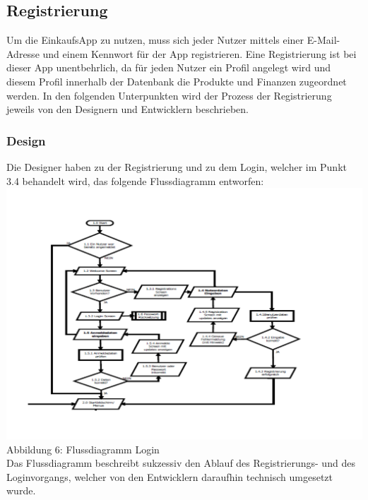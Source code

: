 \documentclass[12pt,a4paper]{article}
\begin{document}
\subsection{Registrierung}
Um die EinkaufsApp zu nutzen, muss sich jeder Nutzer mittels einer E-Mail-Adresse und einem Kennwort für der App registrieren.
Eine Registrierung ist bei dieser App unentbehrlich, da für jeden Nutzer ein Profil angelegt wird und diesem Profil innerhalb der Datenbank die Produkte und Finanzen zugeordnet werden.
In den folgenden Unterpunkten wird der Prozess der Registrierung jeweils von den Designern und Entwicklern beschrieben.
\subsubsection*{Design}
Die Designer haben zu der Registrierung und zu dem Login, welcher im Punkt 3.4 behandelt wird, das folgende Flussdiagramm entworfen:
\\
\hspace*{-10mm} \includegraphics[trim = 17mm 0mm 0mm 20mm, clip, scale=0.8]{Login-PDF.pdf}
\footnotesize Abbildung 6: Flussdiagramm Login
\normalsize
\\
\linebreak
Das Flussdiagramm beschreibt sukzessiv den Ablauf des Registrierungs- und des Loginvorgangs, welcher von den Entwicklern daraufhin technisch umgesetzt wurde.
\newpage
\end{document}
